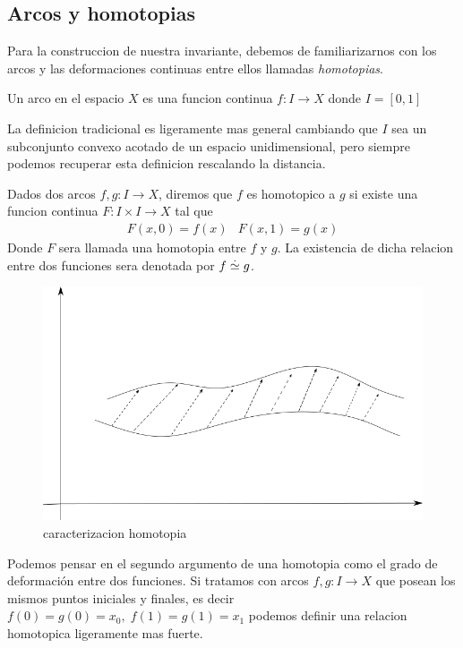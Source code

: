\subsection{Arcos y homotopias}
Para la construccion de nuestra invariante, debemos de familiarizarnos
con los arcos y las deformaciones continuas entre ellos llamadas
\emph{homotopias}.

\begin{definicion}[Arco]
  Un arco en el espacio \(X\) es una funcion continua \(f : I \to X \)
  donde \(I = [0,1]\)
\end{definicion}
La definicion tradicional es ligeramente mas general cambiando que \(I\)
sea un subconjunto convexo acotado de un espacio unidimensional, pero
siempre podemos recuperar esta definicion rescalando la distancia.

\begin{definicion}[Homotopia]
  Dados dos arcos \(f,g : I \to X\), diremos que \(f\) es homotopico a
  \(g\) si existe una funcion continua \(F : I \times I \to X \) tal que
  \[ \begin{matrix}
      F (x, 0) = f(x) & F (x, 1) = g(x)
     \end{matrix}
  \]
  Donde \(F\) sera llamada una homotopia entre \(f\) y \(g\). La
  existencia de dicha relacion entre dos funciones sera denotada por \(f
  \stackrel{.}{\simeq} g\).
\end{definicion}
\begin{figure}[h]
  \centering
  \includegraphics[scale=0.5]{./imagenes/homotopia.png}
  \caption{caracterizacion homotopia}
  \label{fig:homotopia-entre-funciones}
\end{figure}
Podemos pensar en el segundo argumento de una homotopia como el grado de
deformación entre dos funciones.
Si tratamos con arcos \(f,g : I \to X\) que posean los mismos puntos
iniciales y finales, es decir \(f(0) = g(0) = x_0, \; f(1) = g(1) =
x_1 \) podemos definir una relacion homotopica ligeramente mas fuerte.

